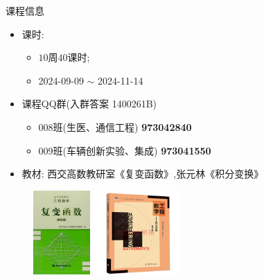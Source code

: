 \begin{frame}[<*>]{课程信息}
\begin{itemize}
	\item 课时:
		\begin{itemize}
			\item $10$周$40$课时;
			\item 2024-09-09 $\sim$ 2024-11-14
		\end{itemize}
	\item 课程QQ群(入群答案 1400261B)
		\begin{itemize}
			\item 008班(生医、通信工程) \alert{\textbf{973042840}}
			\item 009班(车辆创新实验、集成) \alert{\textbf{973041550}}
		\end{itemize}
	\item 教材: 西交高数教研室《复变函数》,张元林《积分变换》
\end{itemize}
\begin{center}
	\begin{figure}
		\includegraphics[height=32mm]{../image/book1.jpg}
		\includegraphics[height=32mm]{../image/book2.png}
	\end{figure}
\end{center}
\end{frame}


